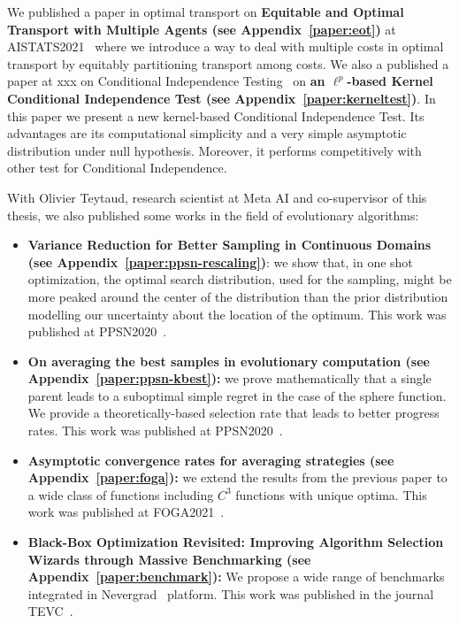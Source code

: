 We  published a paper in optimal transport on \textbf{Equitable and Optimal Transport with Multiple Agents (see Appendix~\ref{paper:eot})} at AISTATS2021~\citep{scetbon2021equitable} where we introduce a way to deal with multiple costs in optimal transport by equitably partitioning transport among costs. We also a published a paper at xxx on Conditional Independence Testing~\citep{scetbon2021ell} on \textbf{ an $\ell^p$-based Kernel Conditional Independence Test (see Appendix~\ref{paper:kerneltest})}. In this paper we present a new kernel-based Conditional Independence Test. Its advantages are its computational simplicity and a very simple asymptotic distribution under null hypothesis. Moreover, it performs competitively with other test for Conditional Independence.

With Olivier Teytaud, research scientist at Meta AI and co-supervisor of this thesis, we also published some works in the field of evolutionary algorithms:
\begin{itemize}

    \item \textbf{Variance Reduction for Better Sampling in Continuous Domains (see Appendix~\ref{paper:ppsn-rescaling})}: we show that, in one shot optimization, the optimal search distribution, used for the sampling, might be more peaked around the center of the distribution than the prior distribution modelling our uncertainty about the location of the optimum. This work was published at PPSN2020~\citep{ppsnrescaling}.
    \item \textbf{On averaging the best samples in evolutionary computation (see Appendix~\ref{paper:ppsn-kbest}):}  we prove mathematically that a single parent leads to a suboptimal simple regret in the case of the sphere function. We provide a theoretically-based selection rate that leads to better progress rates. This work was published at PPSN2020~\citep*{ppsnkbest}.
    \item \textbf{Asymptotic convergence rates for averaging strategies (see Appendix~\ref{paper:foga}):} we extend the results from the previous paper to a wide class of functions including $C^3$ functions with unique optima. This work was published at FOGA2021~\citep{meunier2021asymptotic}.
    \item  \textbf{Black-Box Optimization Revisited: Improving Algorithm Selection Wizards through Massive Benchmarking (see Appendix~\ref{paper:benchmark}):} We propose a wide range of benchmarks integrated in Nevergrad~\citep{nevergrad} platform. This work was published in the journal TEVC~\citep{meunier2021black}.
    
\end{itemize}

